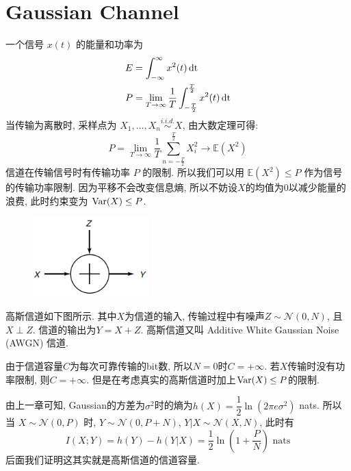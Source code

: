 \section{Gaussian Channel}
一个信号 $x(t)$ 的能量和功率为
\begin{align*}
E &= \int_{-\infty}^{\infty} x^2(t) \operatorname{dt} \\
P &= \lim_{T\to\infty} \dfrac{1}{T}\int_{-\frac{T}{2}}^{\frac{T}{2}} x^2(t) \operatorname{dt}
\end{align*}
当传输为离散时, 采样点为 $X_1,\ldots, X_n\stackrel{i.i.d.}{\sim} X$, 由大数定理可得:
$$P = \lim_{T\to\infty} \dfrac{1}{T}\sum_{n=-\frac{T}{2}}^{\frac{T}{2}} X_i^2\to \mathbb{E}(X^2)$$
信道在传输信号时有传输功率 $P$ 的限制. 所以我们可以用 $\mathbb{E}(X^2)\leq P$ 作为信号的传输功率限制. 因为平移不会改变信息熵, 所以不妨设$X$的均值为$0$以减少能量的浪费, 此时约束变为 $\operatorname{Var}(X)\leq P$.
\begin{figure}[htbp]
    \centering
    \includegraphics[width=0.4\textwidth]{./figures/chapter7/Gaussian_channel.png}
\end{figure}

高斯信道如下图所示. 其中$X$为信道的输入, 传输过程中有噪声$Z \sim \mathcal{N}(0, N)$, 且$X\perp Z$. 信道的输出为$Y = X + Z$. 高斯信道又叫 Additive White Gaussian Noise (AWGN) 信道.

由于信道容量$C$为每次可靠传输的bit数, 所以$N=0$时$C=+\infty$. 若$X$传输时没有功率限制, 则$C=+\infty$. 但是在考虑真实的高斯信道时加上$\operatorname{Var}(X)\leq P$的限制.

由上一章可知, Gaussian的方差为$\sigma^2$时的熵为$h(X) = \dfrac{1}{2}\ln(2\pi e \sigma^2)$ nats. 所以当 $X\sim \mathcal{N}(0, P)$ 时, $Y\sim \mathcal{N}(0, P+N)$, $Y|X\sim \mathcal{N}(X, N)$, 此时有
$$I(X;Y) = h(Y) - h(Y|X) = \dfrac{1}{2}\ln\left(1+\dfrac{P}{N}\right) \text{ nats}$$
后面我们证明这其实就是高斯信道的信道容量.

